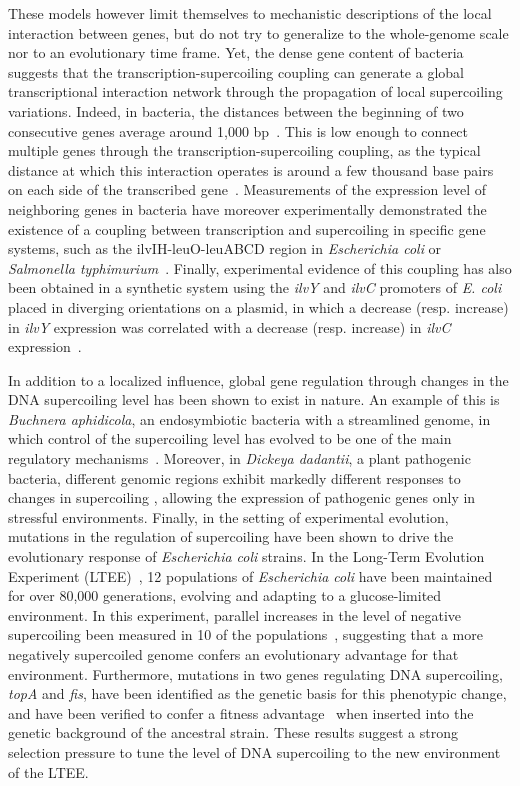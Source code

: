 These models however limit themselves to mechanistic descriptions of the local interaction between genes, but do not try to generalize to the whole-genome scale nor to an evolutionary time frame.
Yet, the dense gene content of bacteria suggests that the transcription-supercoiling coupling can generate a global transcriptional interaction network through the propagation of local supercoiling variations.
Indeed, in bacteria, the distances between the beginning of two consecutive genes average around 1,000 bp~\citep{blattner1997}.
This is low enough to connect multiple genes through the transcription-supercoiling coupling, as the typical distance at which this interaction operates is around a few thousand base pairs on each side of the transcribed gene~\citep{elhanafi2000}.
Measurements of the expression level of neighboring genes in bacteria have moreover experimentally demonstrated the existence of a coupling between transcription and supercoiling in specific gene systems, such as the ilvIH-leuO-leuABCD region in \emph{Escherichia coli} or \emph{Salmonella typhimurium}~\citep{elhanafi2000,sobetzko2016, dorman2016}.
Finally, experimental evidence of this coupling has also been obtained in a synthetic system using the \emph{ilvY} and \emph{ilvC} promoters of \emph{E. coli} placed in diverging orientations on a plasmid, in which a decrease (resp. increase) in \emph{ilvY} expression was correlated with a decrease (resp. increase) in \emph{ilvC} expression~\citep{rhee1999}.


In addition to a localized influence, global gene regulation through changes in the DNA supercoiling level has been shown to exist in nature.
An example of this is \emph{Buchnera aphidicola}, an endosymbiotic bacteria with a streamlined genome, in which control of the supercoiling level has evolved to be one of the main regulatory mechanisms~\citep{brinza2013}.
Moreover, in \emph{Dickeya dadantii}, a plant pathogenic bacteria, different genomic regions exhibit markedly different responses to changes in supercoiling \citep{muskhelishvili2019}, allowing the expression of pathogenic genes only in stressful environments.
Finally, in the setting of experimental evolution, mutations in the regulation of supercoiling have been shown to drive the evolutionary response of \emph{Escherichia coli} strains.
In the Long-Term Evolution Experiment (LTEE)~\citep{lenski1991}, 12 populations of \emph{Escherichia coli} have been maintained for over 80,000 generations, evolving and adapting to a glucose-limited environment.
In this experiment, parallel increases in the level of negative supercoiling been measured in 10 of the populations~\citep{crozat2010}, suggesting that a more negatively supercoiled genome confers an evolutionary advantage for that environment.
Furthermore, mutations in two genes regulating DNA supercoiling, \emph{topA} and \emph{fis}, have been identified as the genetic basis for this phenotypic change, and have been verified to confer a fitness advantage~\citep{crozat2005} when inserted into the genetic background of the ancestral strain.
These results suggest a strong selection pressure to tune the level of DNA supercoiling to the new environment of the LTEE.

